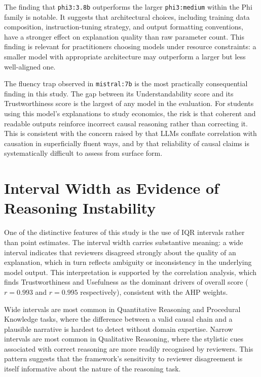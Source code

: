 The finding that \texttt{phi3:3.8b} outperforms the larger \texttt{phi3:medium}
within the Phi family is notable. It suggests that architectural choices, including
training data composition, instruction-tuning strategy, and output formatting
conventions, have a stronger effect on explanation quality than raw parameter count.
This finding is relevant for practitioners choosing models under resource constraints:
a smaller model with appropriate architecture may outperform a larger but less
well-aligned one.

The fluency trap observed in \texttt{mistral:7b} is the most practically consequential
finding in this study. The gap between its Understandability score and its
Trustworthiness score is the largest of any model in the evaluation. For students
using this model's explanations to study economics, the risk is that coherent and
readable outputs reinforce incorrect causal reasoning rather than correcting it. This
is consistent with the concern raised by \citet{jin2024llm} that LLMs conflate
correlation with causation in superficially fluent ways, and by \citet{wu2024causality}
that reliability of causal claims is systematically difficult to assess from surface
form.

\section{Interval Width as Evidence of Reasoning Instability}
\label{sec:disc-interval}

One of the distinctive features of this study is the use of IQR intervals rather
than point estimates. The interval width carries substantive meaning: a wide interval
indicates that reviewers disagreed strongly about the quality of an explanation,
which in turn reflects ambiguity or inconsistency in the underlying model output.
This interpretation is supported by the correlation analysis, which finds
Trustworthiness and Usefulness as the dominant drivers of overall score
($r = 0.993$ and $r = 0.995$ respectively), consistent with the AHP weights.

Wide intervals are most common in Quantitative Reasoning and Procedural Knowledge
tasks, where the difference between a valid causal chain and a plausible narrative is
hardest to detect without domain expertise. Narrow intervals are most common in
Qualitative Reasoning, where the stylistic cues associated with correct reasoning are
more readily recognised by reviewers. This pattern suggests that the framework's
sensitivity to reviewer disagreement is itself informative about the nature of the
reasoning task.

